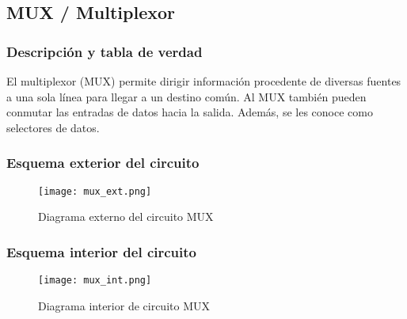 \documentclass[12pt]{article}
\begin{document}
		\subsection{MUX / Multiplexor}
		\subsubsection{Descripción y tabla de verdad}

		El multiplexor (MUX) permite dirigir información procedente de diversas fuentes a una sola línea para llegar a un destino común. Al MUX también pueden conmutar las entradas de datos hacia la salida. Además, se les conoce como selectores de datos.
		\begin{table}[H]
			\centering
			\caption{Tabla de verdad de MUX}
			\label{tab:mux}
		\end{table}
		\subsubsection{Esquema exterior del circuito}
		\begin{figure}[H]
			\centering
			\texttt{[image: mux\_ext.png]}
			\caption{Diagrama externo del circuito MUX} \cite{diagram}
			\label{fig:mux_ext}
		\end{figure}
		\subsubsection{Esquema interior del circuito}
		\begin{figure}[H]
			\centering
			\texttt{[image: mux\_int.png]}
			\caption{Diagrama interior de circuito MUX} \cite{diagram}
			\label{fig:mux_int}
		\end{figure}
\end{document}
